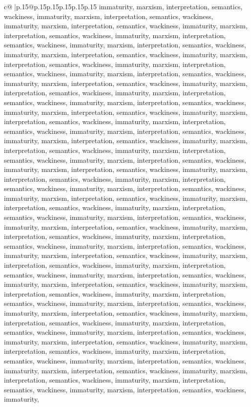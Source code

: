 \documentclass{article}
\begin{document}
{\begin{supertabular}{c@{$\;$}|p{.15\linewidth}@{}p{.15\linewidth}p{.15\linewidth}p{.15\linewidth}p{.15\linewidth}p{.15\linewidth}}
{{{immaturity, marxism, interpretation, semantics, wackiness, immaturity, marxism, interpretation, semantics, wackiness, immaturity, marxism, interpretation, semantics, wackiness, immaturity, marxism, interpretation, semantics, wackiness, immaturity, marxism, interpretation, semantics, wackiness, immaturity, marxism, interpretation, semantics, wackiness, immaturity, marxism, interpretation, semantics, wackiness, immaturity, marxism, interpretation, semantics, wackiness, immaturity, marxism, interpretation, semantics, wackiness, immaturity, marxism, interpretation, semantics, wackiness, immaturity, marxism, interpretation, semantics, wackiness, immaturity, marxism, interpretation, semantics, wackiness, immaturity, marxism, interpretation, semantics, wackiness, immaturity, marxism, interpretation, semantics, wackiness, immaturity, marxism, interpretation, semantics, wackiness, immaturity, marxism, interpretation, semantics, wackiness, immaturity, marxism, interpretation, semantics, wackiness, immaturity, marxism, interpretation, semantics, wackiness, immaturity, marxism, interpretation, semantics, wackiness, immaturity, marxism, interpretation, semantics, wackiness, immaturity, marxism, interpretation, semantics, wackiness, immaturity, marxism, interpretation, semantics, wackiness, immaturity, marxism, interpretation, semantics, wackiness, immaturity, marxism, interpretation, semantics, wackiness, immaturity, marxism, interpretation, semantics, wackiness, immaturity, marxism, interpretation, semantics, wackiness, immaturity, marxism, interpretation, semantics, wackiness, immaturity, marxism, interpretation, semantics, wackiness, immaturity, marxism, interpretation, semantics, wackiness, immaturity, marxism, interpretation, semantics, wackiness, immaturity, marxism, interpretation, semantics, wackiness, immaturity, marxism, interpretation, semantics, wackiness, immaturity, marxism, interpretation, semantics, wackiness, immaturity, marxism, interpretation, semantics, wackiness, immaturity, marxism, interpretation, semantics, wackiness, immaturity, marxism, interpretation, semantics, wackiness, immaturity, marxism, interpretation, semantics, wackiness, immaturity, marxism, interpretation, semantics, wackiness, immaturity, marxism, interpretation, semantics, wackiness, immaturity, marxism, interpretation, semantics, wackiness, immaturity, marxism, interpretation, semantics, wackiness, immaturity, marxism, interpretation, semantics, wackiness, immaturity, marxism, interpretation, semantics, wackiness, immaturity, marxism, interpretation, semantics, wackiness, immaturity, marxism, interpretation, semantics, wackiness, immaturity, marxism, interpretation, semantics, wackiness, immaturity, marxism, interpretation, semantics, wackiness, immaturity, marxism, interpretation, semantics, wackiness, immaturity, marxism, interpretation, semantics, wackiness, immaturity, marxism, interpretation, semantics, wackiness, immaturity, marxism, interpretation, semantics, wackiness, immaturity, marxism, interpretation, semantics, wackiness, immaturity, marxism, interpretation, semantics, wackiness, immaturity, marxism, interpretation, semantics, wackiness, immaturity, }}}
\end{supertabular}}
\end{document}
